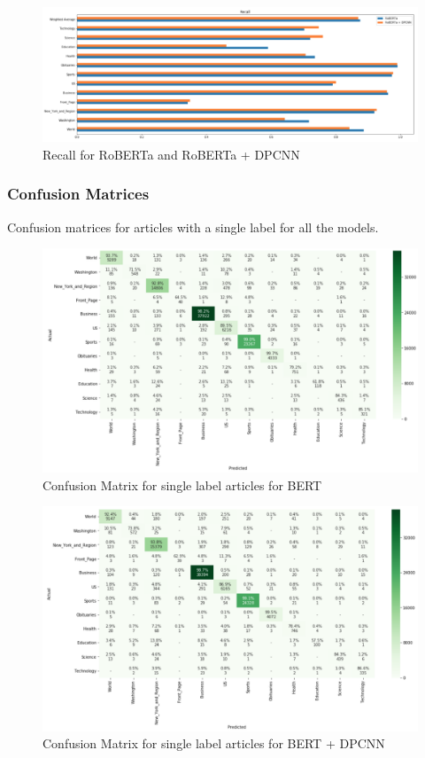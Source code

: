 \documentclass{article}
\begin{document}
\begin{figure}
    \centering
    \includegraphics[scale=0.6]{images/recall_roberta.png}
    \caption{Recall for RoBERTa and RoBERTa + DPCNN}
    \label{fig:recall_roberta}
\end{figure}

\clearpage
\subsubsection{Confusion Matrices} \label{appendix_confusion_matrices}

Confusion matrices for articles with a single label for all the models.

\begin{figure}[!htb]
    \centering
    \includegraphics[scale=0.4]{images/confusion_bert.png}
    \caption{Confusion Matrix for single label articles for BERT}
    \label{fig:confusion_bert}
\end{figure}

\begin{figure}[!htb]
    \centering
    \includegraphics[scale=0.4]{images/confusion_bert_dpcnn.png}
    \caption{Confusion Matrix for single label articles for BERT + DPCNN}
    \label{fig:confusion_bert_dpcnn}
\end{figure}
\end{document}
